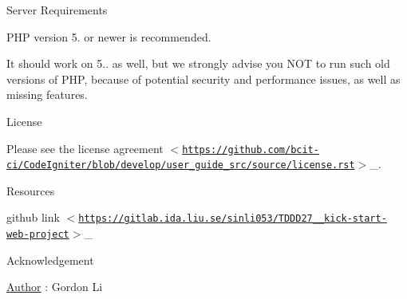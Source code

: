  Server Requirements 



P\+HP version 5. or newer is recommended.

It should work on 5.. as well, but we strongly advise you N\+OT to run such old versions of P\+HP, because of potential security and performance issues, as well as missing features.



 License 



Please see the {\ttfamily license agreement $<$\href{https://github.com/bcit-ci/CodeIgniter/blob/develop/user_guide_src/source/license.rst}{\tt https\+://github.\+com/bcit-\/ci/\+Code\+Igniter/blob/develop/user\+\_\+guide\+\_\+src/source/license.\+rst}$>$}\+\_\+.



 Resources 




\begin{DoxyItemize}
\item {\ttfamily github link $<$\href{https://gitlab.ida.liu.se/sinli053/TDDD27_2018_kick-start-web-project}{\tt https\+://gitlab.\+ida.\+liu.\+se/sinli053/\+T\+D\+D\+D27\+\_\+\_\+kick-\/start-\/web-\/project}$>$}\+\_\+
\end{DoxyItemize}



 Acknowledgement 



\mbox{\hyperlink{class_author}{Author}} \+: Gordon Li 